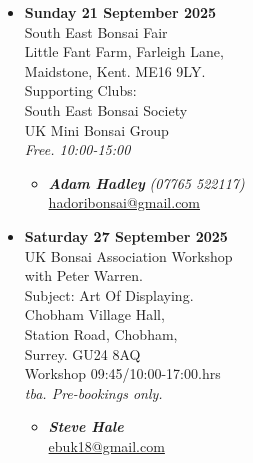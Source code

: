 \begin{itemize}
    \item \textbf{Sunday 21 September 2025}
    \\
    South East Bonsai Fair \\
    Little Fant Farm, Farleigh Lane, \\
    Maidstone, Kent. ME16 9LY. \\
    Supporting Clubs: \\
    South East Bonsai Society \\
    UK Mini Bonsai Group
    \\
    \emph{Free. 10:00-15:00}
    \begin{itemize}
        \item \textbf{\emph{Adam Hadley}} \emph{(07765 522117)} \\
        \href{mailto:hadoribonsai@gmail.com}{hadoribonsai@gmail.com} 
    \end{itemize}

    \item \textbf{Saturday 27 September 2025}
    \\
    UK Bonsai Association Workshop \\
    with Peter Warren. \\
    Subject: Art Of Displaying. \\
    Chobham Village Hall, \\
    Station Road, Chobham, \\
    Surrey. GU24 8AQ \\
    Workshop 09:45/10:00-17:00.hrs
    \\
    \emph{tba. Pre-bookings only.}
    \begin{itemize}
        \item \textbf{\emph{Steve Hale}} \\
        \href{mailto:ebuk18@gmail.com}{ebuk18@gmail.com} 
    \end{itemize}


\end{itemize}
